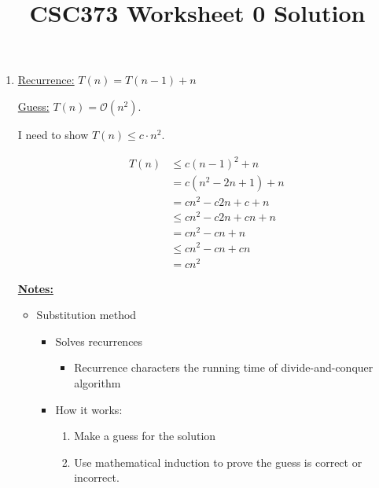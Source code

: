 \documentclass[12pt]{article}
\begin{document}
\title{CSC373 Worksheet 0 Solution}
\maketitle

\bigskip

\begin{enumerate}[1.]
    \item

    \underline{Recurrence:} $T(n) = T(n-1) + n$

    \bigskip

    \underline{Guess:} $T(n) = \mathcal{O}(n^2)$.

    \bigskip

    I need to show $T(n) \leq c \cdot n^2$.

    \bigskip

    \begin{align}
        T(n) &\leq c(n-1)^2 + n\\
        &= c(n^2 -2n + 1) + n\\
        &= cn^2 - c2n + c + n\\
        &\leq cn^2 - c2n + cn + n\\
        &= cn^2 - cn + n\\
        &\leq cn^2 - cn + cn\\
        &= cn^2
    \end{align}

    \bigskip

    \underline{\textbf{Notes:}}

    \bigskip

    \begin{itemize}
        \item Substitution method

        \begin{itemize}
            \item Solves recurrences
            \begin{itemize}
                \item Recurrence characters the running time of divide-and-conquer algorithm
            \end{itemize}
            \item How it works:

            \begin{enumerate}[1.]
                \item Make a guess for the solution
                \item Use mathematical induction to prove the guess is correct or incorrect.
            \end{enumerate}


\end{itemize}
\end{itemize}
\end{enumerate}
\end{document}
